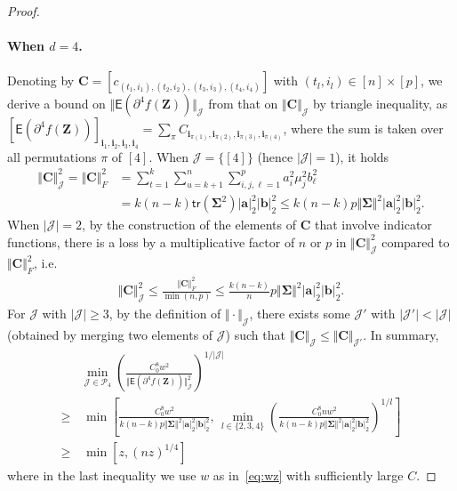 \documentclass[11pt, a4paper]{article}
\newcommand{\mbf}{\mathbf}
\newcommand{\mc}{\mathcal}
\renewcommand{\l}{\left}
\renewcommand{\r}{\right}
\newcommand{\E}[0]{\mathsf{E}}
\newcommand{\tr}[0]{\mathsf{tr}}
\newcommand{\nn}{\nonumber}
\theoremstyle{definition}
\theoremstyle{definition}
\theoremstyle{definition}
\theoremstyle{definition}
\theoremstyle{definition}
\theoremstyle{remark}
\theoremstyle{definition}
\theoremstyle{definition}
\theoremstyle{definition}
\begin{document}
\begin{proof}
\paragraph{When $d = 4$.} Denoting by $\mbf C = [c_{(t_1, i_1), (t_2, i_2), (t_3, i_3), (t_4, i_4)}]$ with $(t_l, i_l) \in [n] \times [p]$, we derive a bound on $\Vert \E(\partial^4 f(\mbf Z)) \Vert_{\mc J}$ from that on $\Vert \mbf C \Vert_{\mc J}$ by triangle inequality, as
$[\E(\partial^4 f(\mbf Z))]_{\mbf i_1, \mbf i_2, \mbf i_3, \mbf i_4} = \sum_\pi C_{\mbf i_{\pi(1)}, \mbf i_{\pi(2)}, \mbf i_{\pi (3)}, \mbf i_{\pi(4)}}$, where the sum is taken over all permutations $\pi$ of $[4]$.
When $\mc J = \{[4]\}$ (hence $\vert \mc J \vert = 1$), it holds
\begin{align*}
\Vert \mbf C \Vert_{\mc J}^2 = \Vert \mbf C \Vert_F^2 &= \sum_{t = 1}^k \sum_{u = k + 1}^n \sum_{i, j, \ell = 1}^p a_i^2 \mu_j^2 b_\ell^2
\\
&= k (n - k) \tr(\bm\Sigma^2) \vert \mbf a \vert_2^2 \vert \mbf b \vert_2^2 
\le k (n - k) p \Vert \bm\Sigma \Vert^2 \vert \mbf a \vert_2^2 \vert \mbf b \vert_2^2.
\end{align*}
When $\vert \mc J \vert = 2$, by the construction of the elements of $\mbf C$ that involve indicator functions, there is a loss by a multiplicative factor of $n$ or $p$ in $\Vert \mbf C \Vert_{\mc J}^2$ compared to $\Vert \mbf C \Vert_F^2$, i.e.\
\begin{align*}
\Vert \mbf C \Vert_{\mc J}^2 \le \frac{\Vert \mbf C \Vert_F^2}{\min(n, p)} \le \frac{k(n - k)}{n} p \Vert \bm\Sigma \Vert^2 \vert \mbf a \vert_2^2 \vert \mbf b \vert_2^2. 
\end{align*}
For $\mc J$ with $\vert \mc J \vert \ge 3$, by the definition of $\Vert \cdot \Vert_{\mc J}$, there exists some $\mc J'$ with $\vert \mc J' \vert < \vert \mc J \vert$ (obtained by merging two elements of $\mc J$) such that $\Vert \mbf C \Vert_{\mc J} \le \Vert \mbf C \Vert_{\mc J'}$.
In summary,
\begin{align}
& \min_{\mc J \in \mc P_4} \l( \frac{C_0^8 w^2}{\Vert \E(\partial^4 f(\mbf Z)) \Vert_{\mc J}^2} \r)^{1/\vert \mc J\vert} 
\nn \\
\ge & \, \min \l[ \frac{C_0^8 w^2}{k (n - k) p \Vert \bm\Sigma \Vert^2 \vert \mbf a \vert_2^2 \vert \mbf b \vert_2^2}, \, \min_{l \in \{2, 3, 4\}} \l( \frac{C_0^8 n w^2}{k(n - k) p \Vert \bm\Sigma \Vert^2 \vert \mbf a \vert_2^2 \vert \mbf b \vert_2^2} \r)^{1/l} \r]\nn \\
\ge & \, \min \l[ z, (nz)^{1/4}\r]
\label{eq:d:four}
\end{align}
where in the last inequality we use $w$ as in~\eqref{eq:wz} with sufficiently large $C$. 
 

\end{proof}
\end{document}

